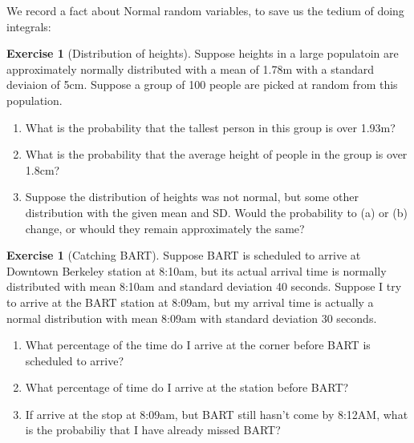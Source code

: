 \documentclass[11pt]{article}
\theoremstyle{definition}
\newtheorem{exercise}[]{Exercise}
\begin{document}
We record a fact about Normal random variables, to save
us the tedium of doing integrals:


\begin{exercise}[Distribution of heights]
Suppose heights in a large populatoin are approximately
normally distributed with a mean of 1.78m with a standard
deviaion of 5cm. Suppose a group of 100 people are picked
at random from this population.
\begin{enumerate}[label = (\alph*)]
  \item What is the probability that the tallest person in this group is over 1.93m?
  \item What is the probability that the average height
  of people in the group is over 1.8cm?
  \item Suppose the distribution of heights was not normal, but some other distribution with the given mean and SD. Would the probability to (a) or (b) change,
  or whould they remain approximately the same?
\end{enumerate}

\end{exercise}

\begin{exercise}[Catching BART]
Suppose BART is scheduled to arrive at Downtown
Berkeley station at 8:10am, but its actual arrival time
is normally distributed with mean 8:10am and standard
deviation 40 seconds.
Suppose I try to arrive at the BART station at 8:09am, but
my arrival time is actually a normal distribution with mean
8:09am with standard deviation 30 seconds.
\begin{enumerate}[label = (\alph*)]
  \item What percentage of the time do I arrive at the
  corner before BART is scheduled to arrive?
  \item What percentage of time do I arrive
  at the station before BART?
  \item If arrive at the stop at 8:09am, but BART still
  hasn't come by 8:12AM, what is the probabiliy that I have already missed BART?
\end{enumerate}

\end{exercise}
\end{document}
